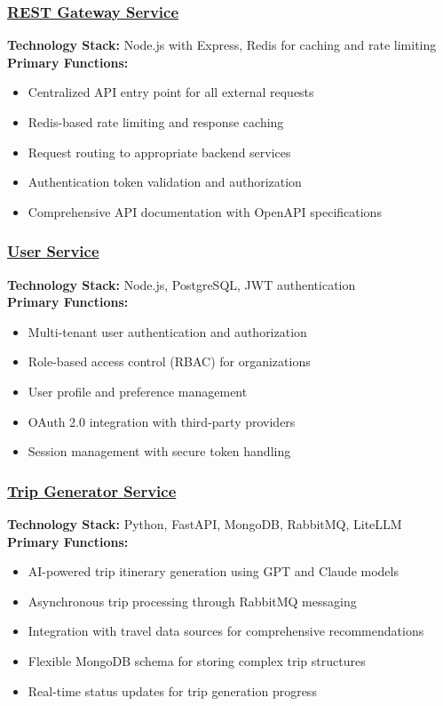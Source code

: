 \subsubsection*{\underline{REST Gateway Service}}
\textbf{Technology Stack:} Node.js with Express, Redis for caching and rate limiting\\
\textbf{Primary Functions:}
\begin{itemize}
    \item Centralized API entry point for all external requests
    \item Redis-based rate limiting and response caching
    \item Request routing to appropriate backend services
    \item Authentication token validation and authorization
    \item Comprehensive API documentation with OpenAPI specifications
\end{itemize}

\subsubsection*{\underline{User Service}}
\textbf{Technology Stack:} Node.js, PostgreSQL, JWT authentication\\
\textbf{Primary Functions:}
\begin{itemize}
    \item Multi-tenant user authentication and authorization
    \item Role-based access control (RBAC) for organizations
    \item User profile and preference management
    \item OAuth 2.0 integration with third-party providers
    \item Session management with secure token handling
\end{itemize}

\subsubsection*{\underline{Trip Generator Service}}
\textbf{Technology Stack:} Python, FastAPI, MongoDB, RabbitMQ, LiteLLM\\
\textbf{Primary Functions:}
\begin{itemize}
    \item AI-powered trip itinerary generation using GPT and Claude models
    \item Asynchronous trip processing through RabbitMQ messaging
    \item Integration with travel data sources for comprehensive recommendations
    \item Flexible MongoDB schema for storing complex trip structures
    \item Real-time status updates for trip generation progress
\end{itemize}

